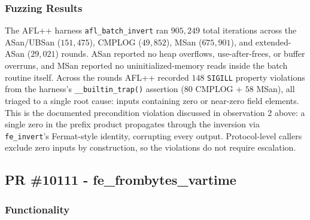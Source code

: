 \documentclass[12pt,titlepage,table]{article}
\begin{document}
\subsubsection{Fuzzing Results}
The AFL++ harness \verb+afl_batch_invert+ ran $905{,}249$ total iterations across the ASan/UBSan ($151{,}475$), CMPLOG ($49{,}852$), MSan ($675{,}901$), and extended-ASan ($29{,}021$) rounds.  ASan reported no heap overflows, use-after-frees, or buffer overruns, and MSan reported no uninitialized-memory reads inside the batch routine itself.  Across the rounds AFL++ recorded $148$ \verb+SIGILL+ property violations from the harness's \verb+__builtin_trap()+ assertion ($80$ CMPLOG + $58$ MSan), all triaged to a single root cause: inputs containing zero or near-zero field elements.  This is the documented precondition violation discussed in observation 2 above: a single zero in the prefix product propagates through the inversion via \verb+fe_invert+'s Fermat-style identity, corrupting every output.  Protocol-level callers exclude zero inputs by construction, so the violations do not require escalation.

\newpage

\subsection{PR \#10111 - fe\_frombytes\_vartime}

\subsubsection{Functionality}

\end{document}
